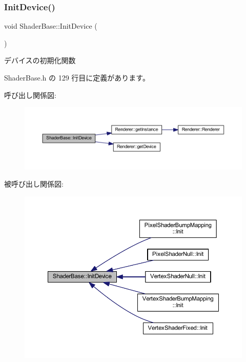 \subsubsection{\texorpdfstring{Init\+Device()}{InitDevice()}}
{\footnotesize\ttfamily void Shader\+Base\+::\+Init\+Device (\begin{DoxyParamCaption}{ }\end{DoxyParamCaption})\hspace{0.3cm}{\ttfamily [inline]}}



デバイスの初期化関数 



 Shader\+Base.\+h の 129 行目に定義があります。

呼び出し関係図\+:
\nopagebreak
\begin{figure}[H]
\begin{center}
\leavevmode
\includegraphics[width=350pt]{class_shader_base_aaac3419f1fce5bf12973e827daadbf8c_cgraph}
\end{center}
\end{figure}
被呼び出し関係図\+:
\nopagebreak
\begin{figure}[H]
\begin{center}
\leavevmode
\includegraphics[width=350pt]{class_shader_base_aaac3419f1fce5bf12973e827daadbf8c_icgraph}
\end{center}
\end{figure}
\mbox{\label{class_shader_base_af45063254b80602db8626360d643baee}} 
